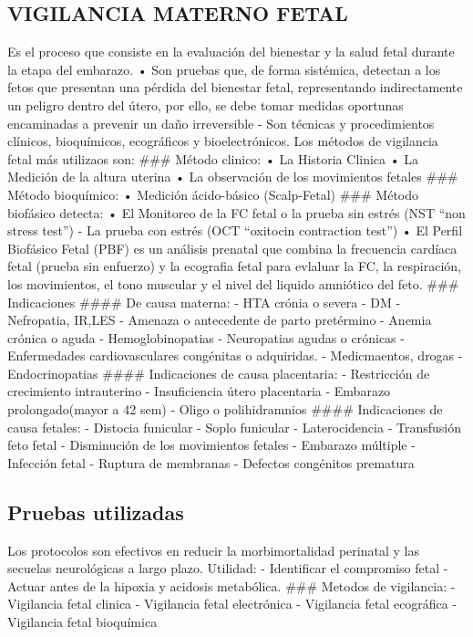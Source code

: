 \documentclass[
]{article}
\begin{document}
\hypertarget{vigilancia-materno-fetal}{%
\subsection{VIGILANCIA MATERNO FETAL}\label{vigilancia-materno-fetal}}

Es el proceso que consiste en la evaluación del bienestar y la salud
fetal durante la etapa del embarazo. • Son pruebas que, de forma
sistémica, detectan a los fetos que presentan una pérdida del bienestar
fetal, representando indirectamente un peligro dentro del útero, por
ello, se debe tomar medidas oportunas encaminadas a prevenir un daño
irreversible - Son técnicas y procedimientos clínicos, bioquímicos,
ecográficos y bioelectrónicos. Los métodos de vigilancia fetal más
utilizaos son: \#\#\# Método clinico: • La Historia Clinica • La
Medición de la altura uterina • La observación de los movimientos
fetales \#\#\# Método bioquímico: • Medición ácido-básico (Scalp-Fetal)
\#\#\# Método biofásico detecta: • El Monitoreo de la FC fetal o la
prueba sin estrés (NST ``non stress test'') - La prueba con estrés (OCT
``oxitocin contraction test'') • El Perfil Biofásico Fetal (PBF) es un
análisis prenatal que combina la frecuencia cardíaca fetal (prueba sin
enfuerzo) y la ecografia fetal para evlaluar la FC, la respiración, los
movimientos, el tono muscular y el nivel del liquido amniótico del feto.
\#\#\# Indicaciones \#\#\#\# De causa materna: - HTA crónia o severa -
DM - Nefropatia, IR,LES - Amenaza o antecedente de parto pretérmino -
Anemia crónica o aguda - Hemoglobinopatias - Neuropatias agudas o
crónicas - Enfermedades cardiovasculares congénitas o adquiridas. -
Medicmaentos, drogas - Endocrinopatias \#\#\#\# Indicaciones de causa
placentaria: - Restricción de crecimiento intrauterino - Insuficiencia
útero placentaria - Embarazo prolongado(mayor a 42 sem) - Oligo o
polihidramnios \#\#\#\# Indicaciones de causa fetales: - Distocia
funicular - Soplo funicular - Laterocidencia - Transfusión feto fetal -
Disminución de los movimientos fetales - Embarazo múltiple - Infección
fetal - Ruptura de membranas - Defectos congénitos prematura

\hypertarget{pruebas-utilizadas}{%
\subsection{Pruebas utilizadas}\label{pruebas-utilizadas}}

Los protocolos son efectivos en reducir la morbimortalidad perinatal y
las secuelas neurológicas a largo plazo. Utilidad: - Identificar el
compromiso fetal - Actuar antes de la hipoxia y acidosis metabólica.
\#\#\# Metodos de vigilancia: - Vigilancia fetal clinica - Vigilancia
fetal electrónica - Vigilancia fetal ecográfica - Vigilancia fetal
bioquímica
\end{document}
